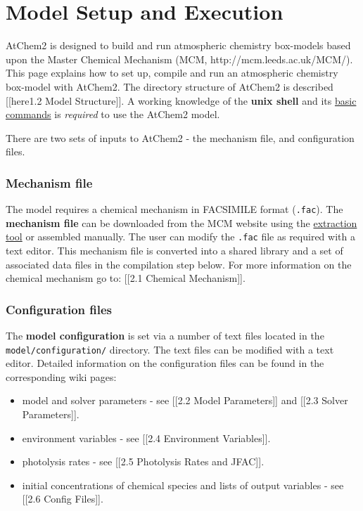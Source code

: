\chapter{Model Setup and Execution}

AtChem2 is designed to build and run atmospheric chemistry box-models
based upon the Master Chemical Mechanism (MCM,
http://mcm.leeds.ac.uk/MCM/). This page explains how to set up, compile
and run an atmospheric chemistry box-model with AtChem2. The directory
structure of AtChem2 is described {[}{[}here\textbar{}1.2 Model
Structure{]}{]}. A working knowledge of the \textbf{unix shell} and its
\href{https://swcarpentry.github.io/shell-novice/reference/}{basic
commands} is \emph{required} to use the AtChem2 model.

There are two sets of inputs to AtChem2 - the mechanism file, and
configuration files.

\hypertarget{mechanism-file}{%
\subsection{Mechanism file}\label{mechanism-file}}

The model requires a chemical mechanism in FACSIMILE format
(\texttt{.fac}). The \textbf{mechanism file} can be downloaded from the
MCM website using the
\href{http://mcm.leeds.ac.uk/MCMv3.3.1/extract.htt}{extraction tool} or
assembled manually. The user can modify the \texttt{.fac} file as
required with a text editor. This mechanism file is converted into a
shared library and a set of associated data files in the compilation
step below. For more information on the chemical mechanism go to:
{[}{[}2.1 Chemical Mechanism{]}{]}.

\hypertarget{configuration-files}{%
\subsection{Configuration files}\label{configuration-files}}

The \textbf{model configuration} is set via a number of text files
located in the \texttt{model/configuration/} directory. The text files
can be modified with a text editor. Detailed information on the
configuration files can be found in the corresponding wiki pages:

\begin{itemize}
\tightlist
\item
  model and solver parameters - see {[}{[}2.2 Model Parameters{]}{]} and
  {[}{[}2.3 Solver Parameters{]}{]}.
\item
  environment variables - see {[}{[}2.4 Environment Variables{]}{]}.
\item
  photolysis rates - see {[}{[}2.5 Photolysis Rates and JFAC{]}{]}.
\item
  initial concentrations of chemical species and lists of output
  variables - see {[}{[}2.6 Config Files{]}{]}.
\end{itemize}

